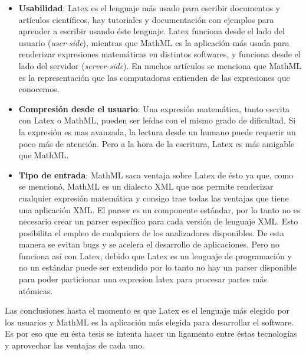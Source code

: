 \begin{itemize}
\item \textbf{Usabilidad}: Latex es el lenguaje más usado para escribir documentos y artículos científicos, hay tutoriales y documentación con ejemplos para aprender a escribir usando éste lenguaje. Latex funciona desde el lado del usuario (\textit{user-side}), mientras que MathML es la aplicación más usada para renderizar expresiones matemáticas en distintos softwares, y funciona desde el lado del servidor (\textit{server-side}). En muchos artículos se menciona que MathML es la representación que las computadoras entienden de las expresiones que conocemos.
\item \textbf{Compresión desde el usuario}: Una expresión matemática, tanto escrita con Latex o MathML, pueden ser leídas con el mismo grado de dificultad. Si la expresión es mas avanzada, la lectura desde un humano puede requerir un poco más de atención. Pero a la hora de la escritura, Latex es más amigable que MathML.
\item \textbf{Tipo de entrada}: MathML saca ventaja sobre Latex de ésto ya que, como se mencionó, MathML es un dialecto XML que nos permite renderizar cualquier expresión matemática y consigo trae todas las ventajas que tiene una aplicación XML. El parser es un componente estándar, por lo tanto no es necesario crear un parser específico para cada versión de lenguaje XML. Esto posibilita el empleo de cualquiera de los analizadores disponibles. De esta manera se evitan bugs y se acelera el desarrollo de aplicaciones. Pero no funciona así con Latex, debido que Latex es un lenguaje de programación y no un estándar puede ser extendido por lo tanto no hay un parser disponible para poder particionar una expresion latex para procesar partes más atómicas. 
\end{itemize}

Las conclusiones hasta el momento es que Latex es el lenguaje más elegido por los usuarios y MathML es la aplicación más elegida para desarrollar el software. Es por eso que en ésta tesis se intenta hacer un ligamento entre éstas tecnologías y aprovechar las ventajas de cada uno.